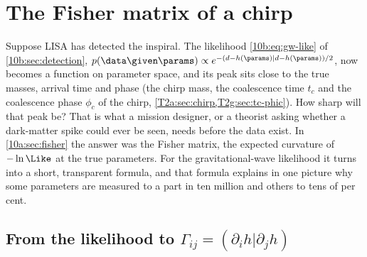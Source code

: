 \section{The Fisher matrix of a chirp}
\label{10b:sec:fisher}

Suppose LISA has detected the inspiral. The likelihood \eqref{10b:eq:gw-like} of \cref{10b:sec:detection},
$p(\data\given\params)\propto e^{-(d-h(\params)|d-h(\params))/2}$, now becomes a function on parameter space, and
its peak sits close to the true masses, arrival time and phase (the chirp mass, the coalescence time $t_c$ and the
coalescence phase $\phi_c$ of the chirp, \cref{T2a:sec:chirp,T2g:sec:tc-phic}). How sharp will that peak be? That is what a mission
designer, or a theorist asking whether a dark-matter spike could ever be seen, needs before the data exist. In
\cref{10a:sec:fisher} the answer was the Fisher matrix, the expected curvature of $-\ln\Like$ at the true
parameters. For the gravitational-wave likelihood it turns into a short, transparent formula, and that formula
explains in one picture why some parameters are measured to a part in ten million and others to tens of per cent.

\subsection{From the likelihood to \texorpdfstring{$\Gamma_{ij}=(\partial_ih|\partial_jh)$}{Gamma = (d_i h | d_j h)}}
\label{10b:sec:fisher-derive}

